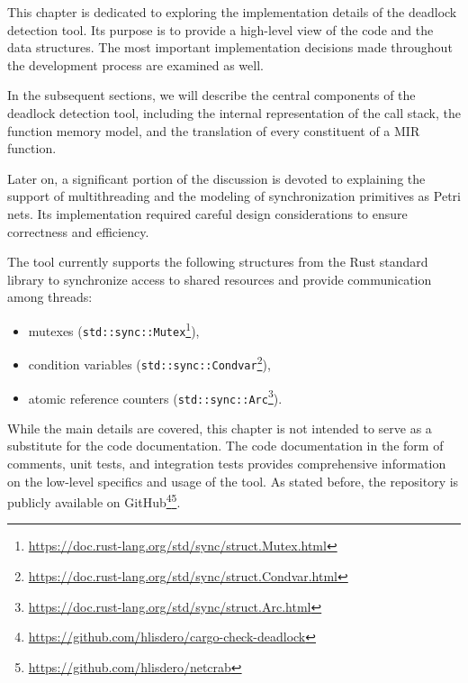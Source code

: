 This chapter is dedicated to exploring
the implementation details of the deadlock detection tool.
Its purpose is to provide a high-level view of the code and the data structures.
The most important implementation decisions made throughout the development process
are examined as well.

In the subsequent sections,
we will describe the central components of the deadlock detection tool,
including the internal representation of the call stack, the function memory model,
and the translation of every constituent of a \acrshort{MIR} function.

Later on, a significant portion of the discussion is devoted to explaining
the support of multithreading and the modeling of synchronization primitives as Petri nets.
Its implementation required careful design considerations
to ensure correctness and efficiency.

The tool currently supports the following structures
from the Rust standard library to synchronize access to shared resources
and provide communication among threads:

\begin{itemize}
  \item mutexes (\texttt{std::sync::Mutex}\footnote{\url{https://doc.rust-lang.org/std/sync/struct.Mutex.html}}),
  \item condition variables (\texttt{std::sync::Condvar}\footnote{\url{https://doc.rust-lang.org/std/sync/struct.Condvar.html}}),
  \item atomic reference counters (\texttt{std::sync::Arc}\footnote{\url{https://doc.rust-lang.org/std/sync/struct.Arc.html}}).
\end{itemize}

While the main details are covered, this chapter is not intended
to serve as a substitute for the code documentation.
The code documentation in the form of comments, unit tests, and integration tests
provides comprehensive information on the low-level specifics and usage of the tool.
As stated before, the repository is publicly available on
GitHub\footnote{\url{https://github.com/hlisdero/cargo-check-deadlock}}\footnote{\url{https://github.com/hlisdero/netcrab}}.